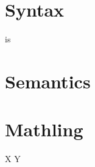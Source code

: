 \documentclass{kharticle}
\begin{document}
\begin{examplebox}
 \par
{}
\end{examplebox}


\section{Syntax}

\begin{examplebox}
\emptyD \emptyT \par
\lv \lvb \lvp \par
\Tpast \Tpres
\end{examplebox}

\begin{examplebox}
\end{examplebox}

\begin{examplebox}
 is 
\end{examplebox}


\section{Semantics}

\begin{examplebox}
 \par
\semet \par
\semeet \par
\semett \par
\semetet
\end{examplebox}

\begin{examplebox}
\end{examplebox}


\section{Mathling}

\begin{examplebox}
\ledge \redge \tedge \bedge \slot \par
{} \par
{} \par
{} \par
X \mergedot Y \par
\end{examplebox}
\end{document}
